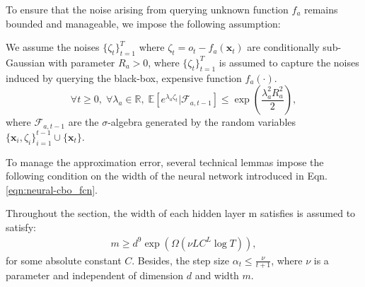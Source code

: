 To ensure that the noise arising from querying unknown function $f_a$ remains bounded and manageable, we impose the following assumption:
\begin{assumption}
\label{assumption:subgaussian_noise}
    We assume the noises $\{\zeta_{ t}\}_{t=1}^T$ where $\zeta_t = o_t - f_a(\mathbf{x}_t)$  are conditionally sub-Gaussian with parameter $R_{a} > 0$, where $\{\zeta_t\}_{t=1}^T$ is assumed to capture the noises induced by querying the black-box, expensive function $f_a(\cdot)$.
 \begin{equation*}
         \forall t \ge 0 , \; \forall \lambda_a \in \mathbb{R}, \;  \mathbb{E}[e^{\lambda_a\zeta_t} \rvert \mathcal{F}_{a,t-1}] \le \exp(\frac{\lambda_a^2 R_a^2}{2}),
 \end{equation*}
 where $\mathcal{F}_{a, t-1}$ are the $\sigma$-algebra generated by the random variables $\{\mathbf{x}_i, \zeta_i\} 
^{t-1}_{i=1} \cup \{\mathbf{x}_t\}$.
\end{assumption}

To manage the approximation error, several technical lemmas impose the following condition on the width of the neural network introduced in Eqn. \eqref{eqn:neural-cbo_fcn}.
\begin{condition}
    \label{condition:neural-cbo_network_width}
    Throughout the section, the width of each hidden layer m satisfies is assumed to satisfy:
    \begin{align}
        m \ge d^9 \exp (\Omega(\nu LC^L\log T)), 
    \end{align}
for some absolute constant $C$. Besides, the step size $\alpha_t \le \frac{\nu}{t+1}$, where $\nu$ is a parameter and independent of dimension $d$ and width $m$.
\end{condition}


